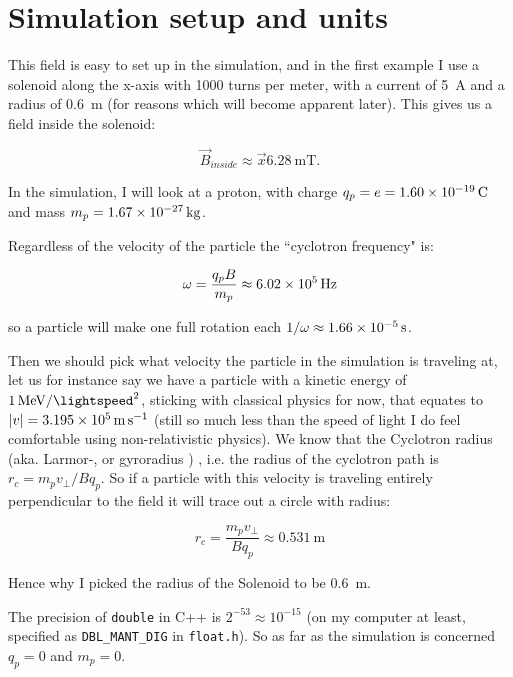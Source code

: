 \documentclass[a4paper,12pt,article]{memoir}
\begin{document}
\section{Simulation setup and units}
This field is easy to set up in the simulation, and in the first example I use a solenoid along the x-axis with 1000 turns per meter, with a current of \SI{5}{\ampere} and a radius of \SI{0.6}{\meter} (for reasons which will become apparent later). This gives us a field inside the solenoid:


\begin{equation}
\vec{B}_{inside} \approx\vec{x} \SI{6.28}{\milli\tesla}.
\end{equation}


In the simulation, I will look at a proton, with charge $q_p=e=\SI{1.60E-19}{\coulomb}$ and mass $m_p=\SI{1.67E-27}{\kilo\gram}$.



Regardless of the velocity of the particle the ``cyclotron frequency" is:

\begin{equation}
\omega = \frac{q_p B}{m_p} \approx \SI{6.02E5}{\hertz}
\end{equation}

so a particle will make one full rotation each $1/\omega \approx \SI{1.66E-05}{\second}$.


Then we should pick what velocity the particle in the simulation is traveling at, let us for instance say we have a particle with a kinetic energy of  $\SI{1}{\mega\electronvolt\per\square\lightspeed}$, sticking with classical physics for now, that equates to $|v|=\SI{3.195E5}{\meter\per\second}$ (still so much less than the speed of light I do feel comfortable using non-relativistic physics). We know that the Cyclotron  radius (aka. Larmor-, or gyroradius ) , i.e. the radius of the cyclotron path is  $r_c= m_p v_\perp/Bq_p$. So if a particle with this velocity is traveling entirely perpendicular to the field it will trace out a circle with radius:

\begin{equation}
r_c = \frac{m_p v_\perp}{B q_p} \approx \SI{0.531}{\meter}
\end{equation}

Hence why I picked the radius of the Solenoid to be \SI{0.6}{\meter}.

The precision of \lstinline{double} in C++ is $2^{-53}\approx 10^{-15}$ (on my computer at least, specified as \lstinline{DBL_MANT_DIG} in \lstinline{float.h}). So as far as the simulation is concerned $q_p=0$ and $m_p=0$.
\end{document}

